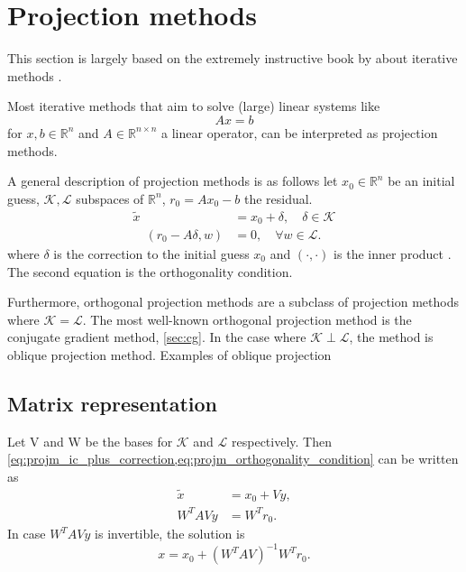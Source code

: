 \section{Projection methods}\label{sec:projm}
This section is largely based on the extremely instructive book by \citeauthor{iter_method_saad} about iterative methods \cite[Section 5: Projection Methods]{iter_method_saad}.

Most iterative methods that aim to solve (large) linear systems like
\[
    Ax = b
\]
for $x, b \in \mathbb{R}^n$ and $A \in \mathbb{R}^{n \times n}$ a linear operator, can be interpreted as projection methods.

A general description of projection methods is as follows let $x_0 \in \mathbb{R}^n$ be an initial guess, $\mathcal{K}, \mathcal{L}$ subspaces of $\mathbb{R}^n$, $r_0 = Ax_0 - b$ the residual.
\begin{subequations}\label{eq:projm_general}
    \begin{align}
        \tilde{x}                & = x_0 + \delta, \quad \delta \in \mathcal{K} \label{eq:projm_ic_plus_correction}
        \\
        \quad (r_0 - A\delta, w) & = 0, \quad \forall w \in \mathcal{L}.
        \label{eq:projm_orthogonality_condition}
    \end{align}
\end{subequations}
where $\delta$ is the correction to the initial guess $x_0$ and $(\cdot, \cdot)$ is the inner product \cite[Equation 5.5-6]{iter_method_saad}. The second equation is the orthogonality condition.

Furthermore, orthogonal projection methods are a subclass of projection methods where $\mathcal{K} = \mathcal{L}$. The most well-known orthogonal projection method is the conjugate gradient method,  \cref{sec:cg}. In the case where $\mathcal{K} \perp \mathcal{L}$, the method is oblique projection method. Examples of oblique projection

\subsection{Matrix representation}
Let V and W be the bases for $\mathcal{K}$ and $\mathcal{L}$ respectively. Then \cref{eq:projm_ic_plus_correction,eq:projm_orthogonality_condition} can be written as 
\begin{align}
    \tilde{x} & = x_0 + Vy, \\
    W^TAVy    & = W^Tr_0.
\end{align}
In case $W^TAVy$ is invertible, the solution is \cite[Equation 5.7]{iter_method_saad}
\begin{equation}
    x = x_0 + (W^TAV)^{-1}W^Tr_0.
    \label{eq:projm_approximate_solution}
\end{equation}

